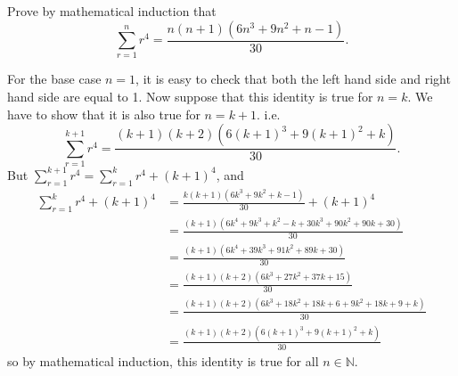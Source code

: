 \begin{question}
    Prove by mathematical induction that 
    \[\sum_{r = 1}^n r^{4} = \frac{n(n + 1)(6n^3 + 9n^2 + n - 1)}{30}.\]
\end{question}
\begin{solution}
    For the base case $n = 1$, it is easy to check that both the left hand side
    and right hand side are equal to 1. Now suppose that this identity is true
    for $n = k$. We have to show that it is also true for $n = k + 1$. i.e.
    \[\sum_{r = 1}^{k + 1}r^4 = \frac{(k + 1)(k + 2)(6(k + 1)^3 + 9(k + 1)^2 +
    k)}{30}.\]
    But $\sum_{r = 1}^{k + 1}r^4 = \sum_{r = 1}^{k} r^4 + (k + 1)^4$, and
    \begin{align*}
        \sum_{r = 1}^{k} r^4 + (k + 1)^4 &= \frac{k(k + 1)(6k^3 + 9k^2 + k - 1)}{30} + (k + 1)^4\\
        &= \frac{(k + 1)(6k^4 + 9k^3 + k^2 - k + 30k^3 + 90k^2 + 90k + 30)}{30}\\
        &= \frac{(k + 1)(6k^4 + 39k^3 + 91k^2 + 89k + 30)}{30}\\
        &= \frac{(k + 1)(k + 2)(6k^3 + 27k^2 + 37k + 15)}{30}\\
        &= \frac{(k + 1)(k + 2)(6k^3 + 18k^2 + 18k + 6 + 9k^2 + 18k + 9 + k)}{30}\\
        &= \frac{(k + 1)(k + 2)(6(k + 1)^3 + 9(k + 1)^2 + k)}{30}
    \end{align*}
    so by mathematical induction, this identity is true for all $n \in
    \mathbb{N}$.
\end{solution}

